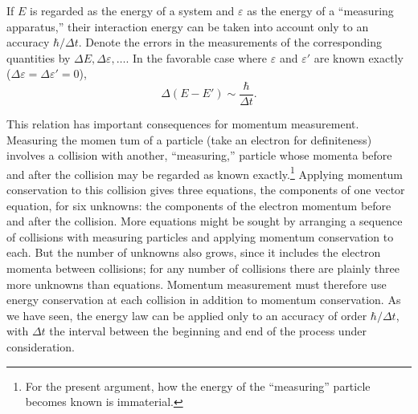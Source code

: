 If $E$ is regarded as the energy of a system and $\varepsilon$ as the energy
of a ``measuring apparatus,'' their interaction energy can be taken into
account only to an accuracy $\hbar/\Delta t$. Denote the errors in the
measurements of the corresponding quantities by
$\Delta E,\Delta\varepsilon,\ldots$. In the favorable case where
$\varepsilon$ and $\varepsilon'$ are known exactly
($\Delta\varepsilon=\Delta\varepsilon'=0$),
\begin{equation}
  \Delta(E-E')\sim\frac{\hbar}{\Delta t}.
  \tag{44.2}
\end{equation}

This relation has important consequences for momentum measurement. Measuring
the momen%
tum of a particle (take an electron for definiteness) involves a
collision with another, ``measuring,'' particle whose momenta before and
after the collision may be regarded as known
exactly.\footnote{For the present argument, how the energy of the
``measuring'' particle becomes known is immaterial.} Applying momentum
conservation to this collision gives three equations, the components of one
vector equation, for six unknowns: the components of the electron momentum
before and after the collision. More equations might be sought by arranging
a sequence of collisions with measuring particles and applying momentum
conservation to each. But the number of unknowns also grows, since it includes
the electron momenta between collisions; for any number of collisions there
are plainly three more unknowns than equations. Momentum measurement must
therefore use energy conservation at each collision in addition to momentum
conservation. As we have seen, the energy law can be applied only to an
accuracy of order $\hbar/\Delta t$, with $\Delta t$ the interval between the
beginning and end of the process under consideration.

